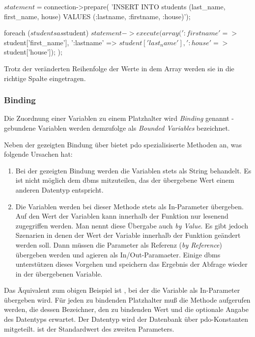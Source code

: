 \begin{listing}[H]
\begin{phpcode}
$statement = $connection->prepare(
  'INSERT INTO students (last_name, first_name, house)
    VALUES (:lastname, :firstname, :house)');

foreach ($students as $student) {
	$statement->execute(
	  array(
	    ':firstname' => $student['first_name'],
	    ':lastname'  => $student['last_name'],
	    ':house'     => $student['house']);
	);
}
\end{phpcode}
\label{lst:insertWithPreparedStatementNamedParams}
\end{listing}

Trotz der veränderten Reihenfolge der Werte in dem Array werden sie in die richtige Spalte eingetragen.

\subsubsection{Binding}
\label{basics:doctrine:subsubsec:binding}
Die Zuordnung einer Variablen zu einem Platzhalter wird \textit{Binding} genannt - gebundene Variablen werden demzufolge als \textit{Bounded Variables} bezeichnet.

Neben der gezeigten Bindung über  bietet \gls{pdo} spezialisiserte Methoden an, was folgende Ursachen hat:

\begin{enumerate}
	\item Bei der gezeigten Bindung werden die Variablen stets als String behandelt. Es ist nicht möglich dem \gls{dbms} mitzuteilen, das der übergebene Wert einem anderen Datentyp entspricht.
	\item Die Variablen werden bei dieser Methode stets als In-Parameter übergeben. Auf den Wert der Variablen kann innerhalb der Funktion nur lesenend zugegriffen werden. Man nennt diese Übergabe auch \textit{by Value}. Es gibt jedoch Szenarien in denen der Wert der Variable innerhalb der Funktion geändert werden soll. Dann müssen die Parameter als Referenz (\textit{by Reference}) übergeben werden und agieren als In/Out-Paramaeter. Einige \gls{dbms} unterstützen dieses Vorgehen und speichern das Ergebnis der Abfrage wieder in der übergebenen Variable.
\end{enumerate}

Das Äquivalent zum obigen Beispiel ist , bei der die Variable als In-Parameter übergeben wird. Für jeden zu bindenden Platzhalter muß die Methode aufgerufen werden, die dessen Bezeichner, den zu bindenden Wert und die optionale Angabe des Datentyps erwartet. Der Datentyp wird der Datenbank über \gls{pdo}-Konstanten mitgeteilt.  ist der Standardwert des zweiten Parameters.

